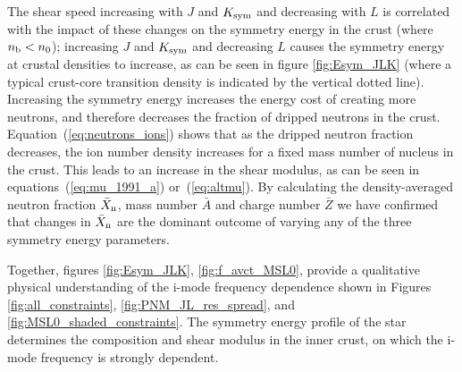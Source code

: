 \documentclass[fleqn,usenatbib]{mnras}
\begin{document}
The shear speed increasing with $J$ and $K_{\rm sym}$ and decreasing with $L$ is correlated with the impact of these changes on the symmetry energy in the crust (where $n_{\rm b}<n_0$); increasing $J$ and $K_{\rm sym}$ and decreasing $L$ causes the symmetry energy at crustal densities to increase, as can be seen in figure \ref{fig:Esym_JLK} (where a typical crust-core transition density is indicated by the vertical dotted line). Increasing the symmetry energy increases the energy cost of creating more neutrons, and therefore decreases the fraction of dripped neutrons in the crust. Equation~(\ref{eq:neutrons_ions}) shows that as the dripped neutron fraction decreases, the ion number density increases for a fixed mass number of nucleus in the crust. This leads to an increase in the shear modulus, as can be seen in equations~(\ref{eq:mu_1991_a}) or~(\ref{eq:altmu}). By calculating the density-averaged neutron fraction $\bar{X}_{\rm n}$, mass number $\bar{A}$ and charge number $\bar{Z}$ we have confirmed that changes in $\bar{X}_{\rm n}$ are the dominant outcome of varying any of the three symmetry energy parameters. 

Together, figures \ref{fig:Esym_JLK}, \ref{fig:f_avct_MSL0}, provide a qualitative physical understanding of the i-mode frequency dependence shown in Figures \ref{fig:all_constraints}, \ref{fig:PNM_JL_res_spread}, and \ref{fig:MSL0_shaded_constraints}. The symmetry energy profile of the star determines the composition and shear modulus in the inner crust, on which the i-mode frequency is strongly dependent.
\end{document}
